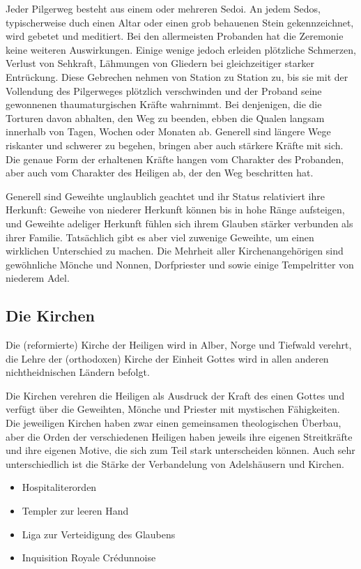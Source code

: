 \documentclass[10pt,twoside,twocolumn,openany]{book}
\begin{document}
\begin{multicols}{2}
	Jeder Pilgerweg besteht aus einem oder mehreren Sedoi. An jedem Sedos, typischerweise duch einen Altar oder einen grob behauenen Stein gekennzeichnet, wird gebetet und meditiert. Bei den allermeisten Probanden hat die Zeremonie keine weiteren Auswirkungen. Einige wenige jedoch erleiden plötzliche Schmerzen, Verlust von Sehkraft, Lähmungen von Gliedern bei gleichzeitiger starker Entrückung. Diese Gebrechen nehmen von Station zu Station zu, bis sie mit der Vollendung des Pilgerweges plötzlich verschwinden und der Proband seine gewonnenen thaumaturgischen Kräfte wahrnimmt. Bei denjenigen, die die Torturen davon abhalten, den Weg zu beenden, ebben die Qualen langsam innerhalb von Tagen, Wochen oder Monaten ab. Generell sind längere Wege riskanter und schwerer zu begehen, bringen aber auch stärkere Kräfte mit sich. Die genaue Form der erhaltenen Kräfte hangen vom Charakter des Probanden, aber auch vom Charakter des Heiligen ab, der den Weg beschritten hat.
	
	Generell sind Geweihte unglaublich geachtet und ihr Status relativiert ihre Herkunft: Geweihe von niederer Herkunft können bis in hohe Ränge aufsteigen, und Geweihte adeliger Herkunft fühlen sich ihrem Glauben stärker verbunden als ihrer Familie. Tatsächlich gibt es aber viel zuwenige Geweihte, um einen wirklichen Unterschied zu machen. Die Mehrheit aller Kirchenangehörigen sind gewöhnliche Mönche und Nonnen, Dorfpriester und sowie einige Tempelritter von niederem Adel.
	
	\subsection{Die Kirchen}
	Die (reformierte) Kirche der Heiligen wird in Alber, Norge und Tiefwald verehrt, die Lehre der (orthodoxen) Kirche der Einheit Gottes wird in allen anderen nichtheidnischen Ländern befolgt.
	
	Die Kirchen verehren die Heiligen als Ausdruck der Kraft des einen Gottes und verfügt über die Geweihten, Mönche und Priester mit mystischen Fähigkeiten. Die jeweiligen Kirchen haben zwar einen gemeinsamen theologischen Überbau, aber die Orden der verschiedenen Heiligen haben jeweils ihre eigenen Streitkräfte und ihre eigenen Motive, die sich zum Teil stark unterscheiden können. Auch sehr unterschiedlich ist die Stärke der Verbandelung von Adelshäusern und Kirchen.
	\begin{itemize}
		\item Hospitaliterorden
		\item Templer zur leeren Hand
		\item Liga zur Verteidigung des Glaubens
		\item Inquisition Royale Crédunnoise
	\end{itemize}


\end{multicols}
\end{document}
